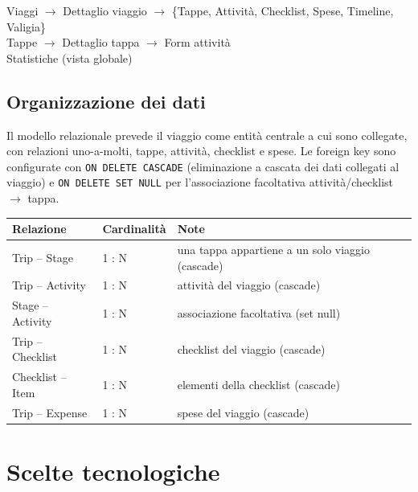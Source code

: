 \documentclass[11pt, a4paper]{article}
\begin{document}
\begin{center}
\ttfamily\small
Viaggi $\rightarrow$ Dettaglio viaggio $\rightarrow$ \{Tappe, Attività, Checklist, Spese, Timeline, Valigia\}\\
Tappe $\rightarrow$ Dettaglio tappa $\rightarrow$ Form attività\\
Statistiche (vista globale)
\end{center}

\subsection{Organizzazione dei dati}
Il modello relazionale prevede il viaggio come entità centrale a cui sono collegate, con
relazioni uno-a-molti, tappe, attività, checklist e spese. Le foreign key sono
configurate con \texttt{ON DELETE CASCADE} (eliminazione a cascata dei dati collegati al
viaggio) e \texttt{ON DELETE SET NULL} per l'associazione facoltativa attività/checklist
$\rightarrow$ tappa.

\begin{table}[h!]
    \centering
    \renewcommand{\arraystretch}{1.2}
    \begin{tabularx}{\textwidth}{l l X}
        \toprule
        \textbf{Relazione} & \textbf{Cardinalità} & \textbf{Note} \\
        \midrule
        Trip -- Stage      & 1 : N & una tappa appartiene a un solo viaggio (cascade) \\
        Trip -- Activity   & 1 : N & attività del viaggio (cascade) \\
        Stage -- Activity  & 1 : N & associazione facoltativa (set null) \\
        Trip -- Checklist  & 1 : N & checklist del viaggio (cascade) \\
        Checklist -- Item  & 1 : N & elementi della checklist (cascade) \\
        Trip -- Expense    & 1 : N & spese del viaggio (cascade) \\
        \bottomrule
    \end{tabularx}
\end{table}

\section{Scelte tecnologiche}
\end{document}
